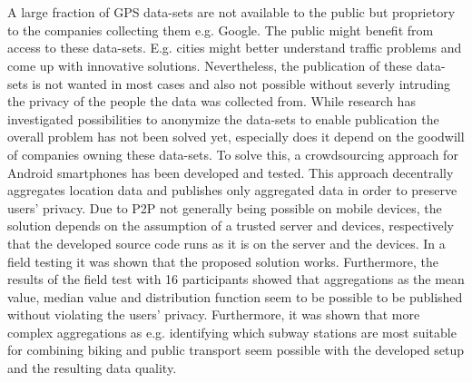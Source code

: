 \chapter{\abstractname}

A large fraction of GPS data-sets are not available to the public but proprietory to the companies collecting them e.g. Google. The public might benefit from access to these data-sets. E.g. cities might better understand traffic problems and come up with innovative solutions. Nevertheless, the publication of these data-sets is not wanted in most cases and also not possible without severly intruding the privacy of the people the data was collected from. While research has investigated possibilities to anonymize the data-sets to enable publication the overall problem has not been solved yet, especially does it depend on the goodwill of companies owning these data-sets. To solve this, a crowdsourcing approach for Android smartphones has been developed and tested. This approach decentrally aggregates location data and publishes only aggregated data in order to preserve users' privacy. Due to P2P not generally being possible on mobile devices, the solution depends on the assumption of a trusted server and devices, respectively that the developed source code runs as it is on the server and the devices. In a field testing it was shown that the proposed solution works. Furthermore, the results of the field test with 16 participants showed that aggregations as the mean value, median value and distribution function seem to be possible to be published without violating the users' privacy. Furthermore, it was shown that more complex aggregations as e.g. identifying which subway stations are most suitable for combining biking and public transport seem possible with the developed setup and the resulting data quality.